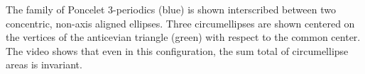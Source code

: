 The family of Poncelet 3-periodics (blue) is shown interscribed between two concentric, non-axis aligned ellipses. Three circumellipses are shown centered on the vertices of the anticevian triangle (green) with respect to the common center. The video shows that even in this configuration, the sum total of circumellipse areas is invariant.